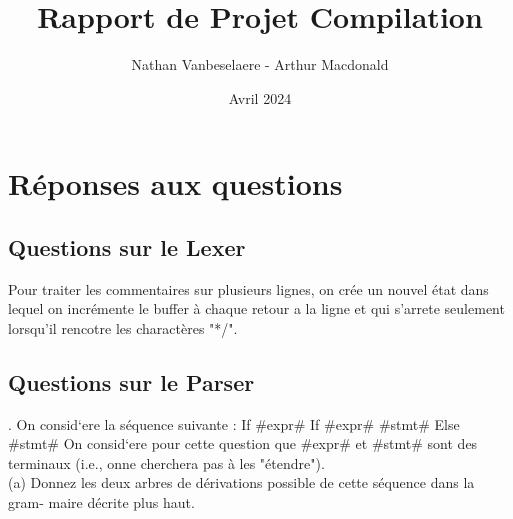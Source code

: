 \documentclass{report}
\title{\textbf{\Huge Rapport de Projet Compilation }}
\author{Nathan Vanbeselaere - Arthur Macdonald}
\date{Avril 2024}
\begin{document}
\maketitle
\newpage

\tableofcontents
\newpage

\chapter{Réponses aux questions}

    \section{Questions sur le Lexer}

        Pour traiter les commentaires sur plusieurs lignes, on crée un nouvel état dans lequel on incrémente le buffer à chaque retour a la ligne et qui s'arrete seulement lorsqu'il rencotre les charactères "*/". 

    \section{Questions sur le Parser}
    
    . On consid`ere la séquence suivante : If \#expr\# If \#expr\# \#stmt\# Else \#stmt\#
\quad On consid`ere pour cette question que \#expr\# et \#stmt\# sont des terminaux (i.e., onne cherchera pas à les "étendre").\\
    
    \quad (a) Donnez les deux arbres de dérivations possible de cette séquence dans la gram-
    maire décrite plus haut.
\end{document}

